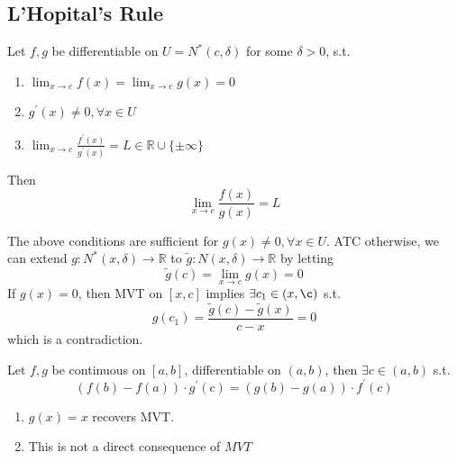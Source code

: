 
\subsection{L'Hopital's Rule}

\begin{theorem}
    \label{thm:lhopital-1}
    Let $f, g$ be differentiable on 
    $U = N^*(c, \delta)$ 
    for some $\delta > 0$, s.t. 
    \begin{enumerate}
        \item $\lim_{x \to c}f(x) = \lim_{x \to c}g(x) = 0$
        \item $g^{\prime}(x) \neq 0, \forall x \in U$
        \item $\lim_{x \to c} \frac{f^{\prime}(x)}{g^{\prime}(x)} = L \in \mathbb{R} \cup \{ \pm \infty \} $
    \end{enumerate}
    Then
    \[
        \lim_{x \to c} \frac{f(x)}{g(x)} = L
    \]
\end{theorem}

\begin{remark}
    The above conditions are sufficient for $g(x) \neq 0, \forall x \in U$.
    ATC otherwise, we can extend $g: N^*(x, \delta) \to \mathbb{R}$
    to $\tilde{g}: N(x, \delta) \to \mathbb{R}$ by letting 
    \[
        \tilde{g} (c) = \lim_{x \to c}g(x) = 0
    \]
    If $g(x) = 0$, then MVT on $[x, c]$ 
    implies $\exists c_1 \in (x, \c)$ s.t.
    \[
        g(c_1)= \frac{
            \tilde{g}(c) - \tilde{g}(x)
        }{
            c - x
        } = 0
    \]
    which is a contradiction.
\end{remark}

\begin{lemma}
    Let $f, g $ be continuous on $[a,b]$, 
    differentiable on $(a,b)$, then 
    $\exists c\in (a,b)$ s.t.
    \[
        \left( f(b) - f(a) \right) \cdot g^{\prime}(c)
        =
        \left( g(b) - g(a) \right) \cdot f^{\prime}(c)
    \]
\end{lemma}

\begin{remark}
    \hfill
    \begin{enumerate}
        \item $g(x) = x$ recovers MVT.
        \item This is not a direct consequence of $MVT$
    \end{enumerate} 
\end{remark}

